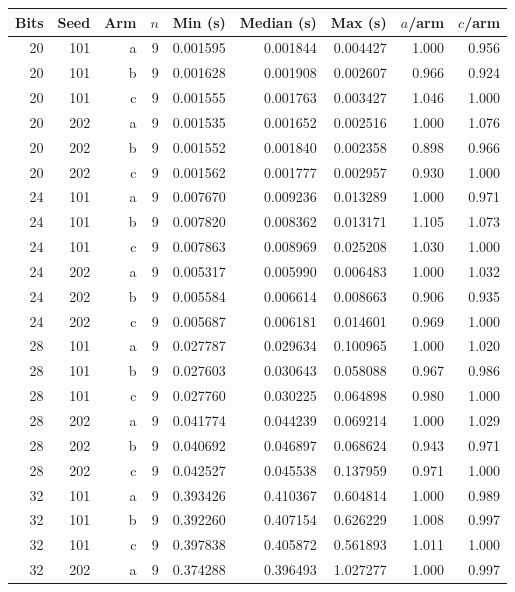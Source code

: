 \begin{tabular}{rrrrrrrrr}\toprule
Bits & Seed & Arm & $n$ & Min (s) & Median (s) & Max (s) & $a$/arm & $c$/arm \\ \midrule
20 & 101 & a & 9 & 0.001595 & 0.001844 & 0.004427 & 1.000 & 0.956 \\
20 & 101 & b & 9 & 0.001628 & 0.001908 & 0.002607 & 0.966 & 0.924 \\
20 & 101 & c & 9 & 0.001555 & 0.001763 & 0.003427 & 1.046 & 1.000 \\
20 & 202 & a & 9 & 0.001535 & 0.001652 & 0.002516 & 1.000 & 1.076 \\
20 & 202 & b & 9 & 0.001552 & 0.001840 & 0.002358 & 0.898 & 0.966 \\
20 & 202 & c & 9 & 0.001562 & 0.001777 & 0.002957 & 0.930 & 1.000 \\
24 & 101 & a & 9 & 0.007670 & 0.009236 & 0.013289 & 1.000 & 0.971 \\
24 & 101 & b & 9 & 0.007820 & 0.008362 & 0.013171 & 1.105 & 1.073 \\
24 & 101 & c & 9 & 0.007863 & 0.008969 & 0.025208 & 1.030 & 1.000 \\
24 & 202 & a & 9 & 0.005317 & 0.005990 & 0.006483 & 1.000 & 1.032 \\
24 & 202 & b & 9 & 0.005584 & 0.006614 & 0.008663 & 0.906 & 0.935 \\
24 & 202 & c & 9 & 0.005687 & 0.006181 & 0.014601 & 0.969 & 1.000 \\
28 & 101 & a & 9 & 0.027787 & 0.029634 & 0.100965 & 1.000 & 1.020 \\
28 & 101 & b & 9 & 0.027603 & 0.030643 & 0.058088 & 0.967 & 0.986 \\
28 & 101 & c & 9 & 0.027760 & 0.030225 & 0.064898 & 0.980 & 1.000 \\
28 & 202 & a & 9 & 0.041774 & 0.044239 & 0.069214 & 1.000 & 1.029 \\
28 & 202 & b & 9 & 0.040692 & 0.046897 & 0.068624 & 0.943 & 0.971 \\
28 & 202 & c & 9 & 0.042527 & 0.045538 & 0.137959 & 0.971 & 1.000 \\
32 & 101 & a & 9 & 0.393426 & 0.410367 & 0.604814 & 1.000 & 0.989 \\
32 & 101 & b & 9 & 0.392260 & 0.407154 & 0.626229 & 1.008 & 0.997 \\
32 & 101 & c & 9 & 0.397838 & 0.405872 & 0.561893 & 1.011 & 1.000 \\
32 & 202 & a & 9 & 0.374288 & 0.396493 & 1.027277 & 1.000 & 0.997 \\

\end{tabular}
